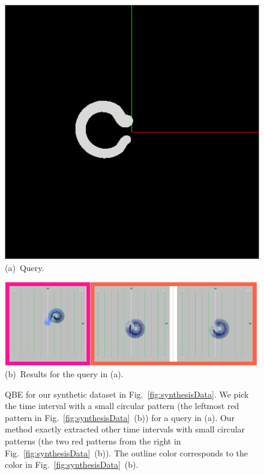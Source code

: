 \begin{figure}[tb]
    \centering
    \begin{minipage}{0.24\linewidth}
        \centering
        \includegraphics[width=.99\linewidth]{vgtc_journal_latex/figures/QBE.png}
        \footnotesize{\sf (a)~Query.}
    \end{minipage}
    \begin{minipage}{0.75\linewidth}
        \centering
        \includegraphics[width=.99\linewidth]{vgtc_journal_latex/figures/QBEdemodataResults_revised.png}
        \footnotesize{\sf(b)~Results for the query in (a).}
    \end{minipage}
    \caption{QBE for our synthetic dataset in Fig.~\ref{fig:synthesisData}. 
        We pick the time interval with a small circular pattern (the leftmost red pattern in Fig.~\ref{fig:synthesisData}~(b)) for a query in (a). 
        Our method exactly extracted other time intervals with small circular patterns (the two red patterns from the right in Fig.~\ref{fig:synthesisData}~(b)).
        The outline color corresponds to the color in Fig.~\ref{fig:synthesisData}~(b).}
    \label{fig:QBEDemodata}
\end{figure}
